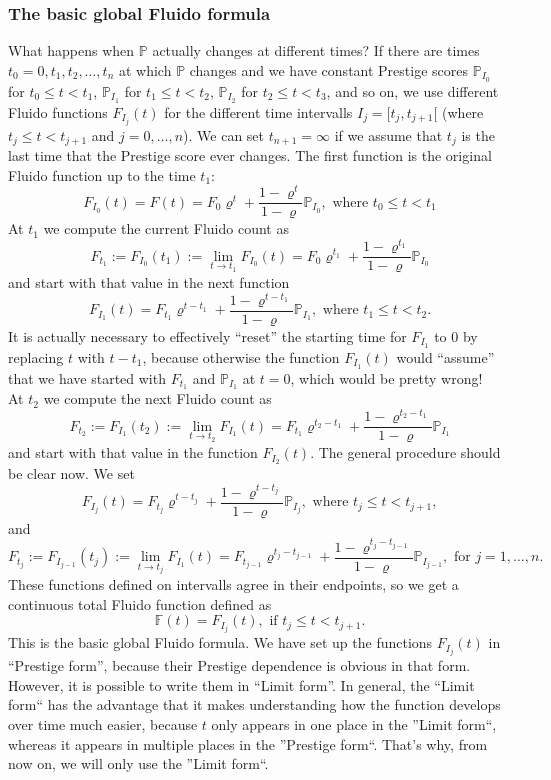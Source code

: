 \documentclass[a4paper,12pt]{scrartcl}
\newcounter{formula}
\begin{document}
\subsubsection{The basic global Fluido formula}
What happens when $\mathbb{P}$ actually changes at different times? If there are times $t_0 = 0, t_1, t_2, \ldots, t_n$ at which $\mathbb{P}$ changes and we have constant Prestige scores $\mathbb{P}_{I_0}$ for $t_0 \leq t < t_1$, $\mathbb{P}_{I_1}$ for $t_1 \leq t < t_2$, $\mathbb{P}_{I_2}$ for $t_2 \leq t < t_3$, and so on, we use different Fluido functions $F_{I_j}(t)$ for the different time intervalls $I_j = [\left.t_j,t_{j+1}[\right.$ (where $t_j \leq t < t_{j+1}$ and $j=0,\ldots,n$). We can set $t_{n+1} = \infty$ if we assume that $t_j$ is the last time that the Prestige score ever changes. The first function is the original Fluido function up to the time $t_1$:
$$F_{I_0}(t) = F(t) = F_0 \varrho^t +\frac{1- \varrho^t}{1-\varrho} \mathbb{P}_{I_0}, \mbox{ where } t_0 \leq t < t_1$$
At $t_1$ we compute the current Fluido count as
$$F_{t_1} := F_{I_0}(t_1) := \lim_{t \rightarrow t_1} F_{I_0}(t) = F_0 \varrho^{t_1} +\frac{1- \varrho^{t_1}}{1-\varrho} \mathbb{P}_{I_0}$$
and start with that value in the next function
$$F_{I_1}(t) = F_{t_1} \varrho^{t-t_1} + \frac{1- \varrho^{t-t_1}}{1-\varrho} \mathbb{P}_{I_1}, \mbox{ where } t_1 \leq t < t_2.$$
It is actually necessary to effectively ``reset'' the starting time for $F_{I_1}$ to $0$ by replacing $t$ with $t-t_1$, because otherwise the function $F_{I_1}(t)$ would ``assume'' that we have started with $F_{t_1}$ and $\mathbb{P}_{I_1}$ at $t=0$, which would be pretty wrong!\\
At $t_2$ we compute the next Fluido count as 
$$F_{t_2} := F_{I_1}(t_2) := \lim_{t \rightarrow t_2} F_{I_1}(t) = F_{t_1} \varrho^{t_2-t_1} +\frac{1- \varrho^{t_2-t_1}}{1-\varrho} \mathbb{P}_{I_1}$$
and start with that value in the function $F_{I_2}(t)$. The general procedure should be clear now. We set
$$F_{I_j}(t) = F_{t_j} \varrho^{t-t_j} + \frac{1- \varrho^{t-t_j}}{1-\varrho} \mathbb{P}_{I_j}, \mbox{ where } t_j \leq t < t_{j+1},$$
and
$$F_{t_j} := F_{I_{j-1}}(t_j):= \lim_{t \rightarrow t_j} F_{I_1}(t) = F_{t_{j-1}} \varrho^{t_j-t_{j-1}} +\frac{1- \varrho^{t_j-t_{j-1}}}{1-\varrho} \mathbb{P}_{I_{j-1}}, \mbox{ for } j = 1, \ldots, n.$$
These functions defined on intervalls agree in their endpoints, so we get a continuous total Fluido function defined as
$$\mathbb{F}(t) = F_{I_j} (t), \mbox{ if } t_j \leq t < t_{j+1}.$$
This is the basic global Fluido formula. We have set up the functions $F_{I_j}(t)$ in ``Prestige form'', because their Prestige dependence is obvious in that form. However, it is possible to write them in ``Limit form''. In general, the ``Limit form`` has the advantage that it makes understanding how the function develops over time much easier, because $t$ only appears in one place in the ''Limit form``, whereas it appears in multiple places in the ''Prestige form``. That's why, from now on, we will only use the ''Limit form``.\\
\end{document}
